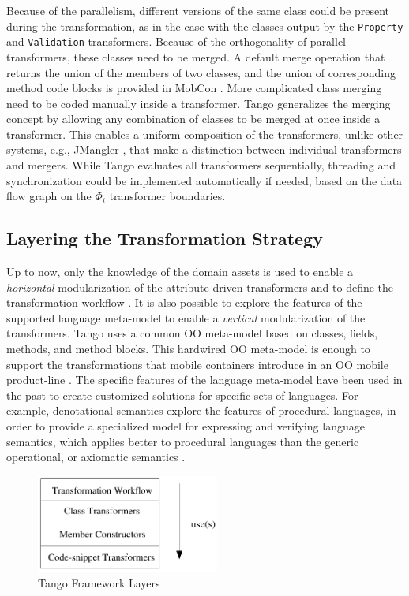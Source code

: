 Because of the parallelism, different versions of the same class could be present during the transformation, as in the case with the classes output by the \texttt{Pro\-per\-ty} and \texttt{Va\-li\-da\-tion} transformers. Because of the orthogonality of parallel transformers, these classes need to be merged. A default merge operation that returns the union of the members of two classes, and the union of corresponding method code blocks  is provided in MobCon . More complicated class merging need to be coded manually inside a transformer. Tango generalizes the merging concept by allowing any combination of classes to be merged at once inside a transformer. This enables a uniform composition of the transformers, unlike other systems, e.g., JMangler \cite{jmangler}, that make a distinction between individual transformers and mergers. While Tango evaluates all transformers sequentially, threading and synchronization could be implemented automatically if needed, based on the data flow \cite{mozart.04} graph on the $\Phi_i$ transformer boundaries.   
 
\subsection{Layering the Transformation Strategy}
\label{sec.tango.layers}

Up to now, only the knowledge of the domain assets is used to enable a \textit{horizontal} modularization of the attribute-driven transformers  and to define the transformation workflow . It is also possible to explore the features of the supported language meta-model to enable a \textit{vertical} modularization of the transformers. Tango uses a common OO meta-model based on classes, fields, methods, and method blocks. This hardwired OO meta-model is enough to support the transformations that mobile containers introduce in an OO mobile product-line . The specific features of the language meta-model have been used in the past to create customized solutions for specific sets of languages. For example, denotational semantics \cite{sem.99,apld.96} explore the features of procedural languages, in order to provide a specialized model for expressing and verifying language semantics, which applies better to procedural languages than the generic operational, or axiomatic semantics \cite{sem.99}.

\begin{figure}[ht]
		\centering
		\includegraphics[width=6cm,height=!]{ch04/layers}
	\caption{Tango Framework Layers}
	\label{fig:layers}
\end{figure}

